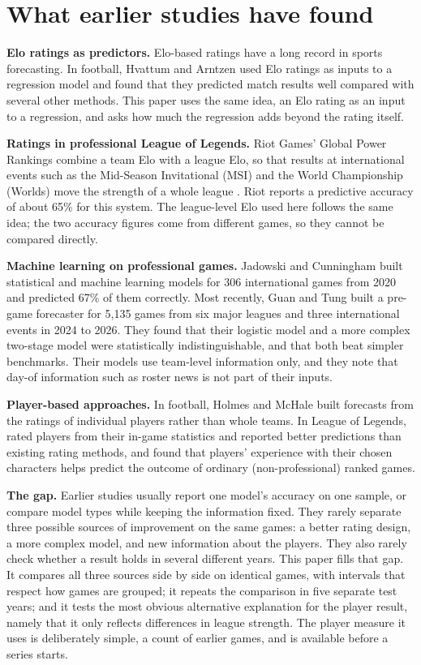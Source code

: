 \documentclass[12pt,a4paper]{article}
\begin{document}
\section{What earlier studies have found}\label{sec:lit}

\textbf{Elo ratings as predictors.} Elo-based ratings have a long record in sports forecasting. In football, Hvattum and Arntzen \citeyearpar{hvattum2010} used Elo ratings as inputs to a regression model and found that they predicted match results well compared with several other methods. This paper uses the same idea, an Elo rating as an input to a regression, and asks how much the regression adds beyond the rating itself.

\textbf{Ratings in professional League of Legends.} Riot Games' Global Power Rankings combine a team Elo with a league Elo, so that results at international events such as the Mid-Season Invitational (MSI) and the World Championship (Worlds) move the strength of a whole league \citep{riot2024}. Riot reports a predictive accuracy of about 65\% for this system. The league-level Elo used here follows the same idea; the two accuracy figures come from different games, so they cannot be compared directly.

\textbf{Machine learning on professional games.} Jadowski and Cunningham \citeyearpar{jadowski2022} built statistical and machine learning models for 306 international games from 2020 and predicted 67\% of them correctly. Most recently, Guan and Tung \citeyearpar{guan2026} built a pre-game forecaster for 5,135 games from six major leagues and three international events in 2024 to 2026. They found that their logistic model and a more complex two-stage model were statistically indistinguishable, and that both beat simpler benchmarks. Their models use team-level information only, and they note that day-of information such as roster news is not part of their inputs.

\textbf{Player-based approaches.} In football, Holmes and McHale \citeyearpar{holmes2024} built forecasts from the ratings of individual players rather than whole teams. In League of Legends, \citet{debois2025} rated players from their in-game statistics and reported better predictions than existing rating methods, and \citet{do2021} found that players' experience with their chosen characters helps predict the outcome of ordinary (non-professional) ranked games.

\textbf{The gap.} Earlier studies usually report one model's accuracy on one sample, or compare model types while keeping the information fixed. They rarely separate three possible sources of improvement on the same games: a better rating design, a more complex model, and new information about the players. They also rarely check whether a result holds in several different years. This paper fills that gap. It compares all three sources side by side on identical games, with intervals that respect how games are grouped; it repeats the comparison in five separate test years; and it tests the most obvious alternative explanation for the player result, namely that it only reflects differences in league strength. The player measure it uses is deliberately simple, a count of earlier games, and is available before a series starts.
\end{document}
